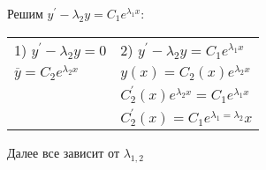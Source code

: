 \documentclass[12pt]{article}
\begin{document}
    Решим $y^\prime - \lambda_2 y = C_1 e^{\lambda_1 x}$:

    \begin{tabular}{p{5cm}p{10cm}}
        1) $y^\prime - \lambda_2 y = 0$      & 2) $y^\prime - \lambda_2 y = C_1 e^{\lambda_1 x}$     \\

        $\overline{y} = C_2 e^{\lambda_2 x}$ & $y(x) = C_2(x)e^{\lambda_2 x}$                        \\

        & $C_2^\prime(x) e^{\lambda_2 x} = C_1 e^{\lambda_1 x}$ \\

        & $C^\prime_2 (x) = C_1 e^{\lambda_1 = \lambda_2} x$
    \end{tabular}

    Далее все зависит от $\lambda_{1,2}$
\end{document}
